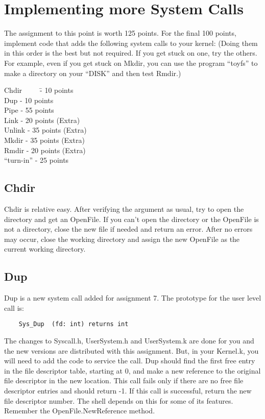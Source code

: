 \documentclass[11pt]{article}
\begin{document}
\section{Implementing more System Calls}

The assignment to this point is worth 125 points.  For the final 100
points, implement code that adds the following system calls to your
kernel: (Doing them in this order is the best but not required.  If
you get stuck on one, try the others.  For example, even if you get
stuck on Mkdir, you can use the program ``toyfs'' to make a directory on
your “DISK” and then test Rmdir.)
\begin{tabbing}
 Chdir\ \ \ \ \ \= - 10 points \\
 Dup \> - 10 points \\
 Pipe \> - 55 points \\
 Link \> - 20 points  (Extra) \\
 Unlink \> - 35 points (Extra) \\
 Mkdir \> - 35 points (Extra) \\
 Rmdir \> - 20 points (Extra) \\
 ``turn-in'' \> - 25 points \\
\end{tabbing}

\subsection{Chdir}
Chdir is relative easy.  After verifying the argument as usual, try to
open the directory and get an OpenFile.  If you can't open the
directory or the OpenFile is not a directory, close the new file if
needed and return an error.  After no errors may occur, close the
working directory and assign the new OpenFile as the current working
directory.

\subsection{Dup}

Dup is a new system call added for assignment 7. The prototype
for the user level call is:
\begin{verbatim}
    Sys_Dup  (fd: int) returns int
\end{verbatim}

The changes to Syscall.h, UserSystem.h and UserSystem.k are done for
you and the new versions are distributed with this assignment.  But,
in your Kernel.k, you will need to add the code to service the call.
Dup should find the first free entry in the file descriptor table,
starting at 0, and make a new reference to the original file
descriptor in the new location. This call fails only if there are no
free file descriptor entries and should return -1.  If this call is
successful, return the new file descriptor number.  The shell depends
on this for some of its features.  Remember the OpenFile.NewReference
method.
\end{document}
